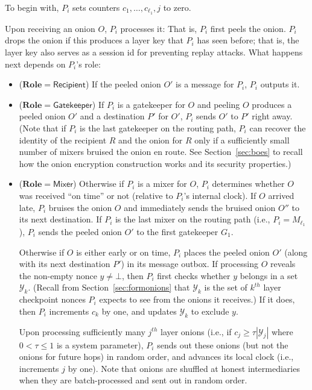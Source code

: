 \documentclass[runningheads,a4paper]{llncs}
\begin{document}
To begin with, $P_i$ sets counters $c_1, \dots, c_{\ell_1}, j$ to zero. 

Upon receiving an onion $O$, $P_i$ processes it: That is, $P_i$ first peels the onion. $P_i$ drops the onion if this produces a layer key that $P_i$ has seen before; that is, the layer key also serves as a session id for preventing replay attacks. 
What happens next depends on $P_i$'s role:
\begin{itemize}
\item ($\mathbf{Role} = \mathsf{Recipient}$) If the peeled onion $O'$ is a message for $P_i$, $P_i$ outputs it.  

\item ($\mathbf{Role} = \mathsf{Gatekeeper}$) If $P_i$ is a gatekeeper for $O$ and peeling $O$ produces a peeled onion $O'$ and a destination $P'$ for $O'$, $P_i$ sends $O'$ to $P'$ right away. (Note that if $P_i$ is the last gatekeeper on the routing path, $P_i$ can recover the identity of the recipient $R$ and the onion for $R$ only if a sufficiently small number of mixers bruised the onion en route. See Section~\ref{sec:boes} to recall how the onion encryption construction works and its security properties.)  

\item ($\mathbf{Role} = \mathsf{Mixer}$)  Otherwise if $P_i$ is a mixer for $O$, $P_i$ determines whether $O$ was received ``on time'' or not (relative to $P_i$'s internal clock). 
If $O$ arrived late, $P_i$ bruises the onion $O$ and immediately sends the bruised onion $O''$ to its next destination. If $P_i$ is the last mixer on the routing path (i.e., $P_i = M_{\ell_1}$), $P_i$ sends the peeled onion $O'$ to the first gatekeeper $G_1$. 

\hspace{4mm} Otherwise if $O$ is either early or on time, $P_i$ places the peeled onion $O'$  (along with its next destination $P'$) in its message outbox. 
If processing $O$ reveals the non-empty nonce $y \neq \bot$, then $P_{i}$ first checks whether $y$ belongs in a set $\mathcal{Y}_k$. (Recall from Section~\ref{sec:formonions} that $\mathcal{Y}_k$ is the set of $k^{th}$ layer checkpoint nonces $P_i$ expects to see from the onions it receives.) If it does, then $P_i$ increments $c_k$ by one, and %
updates $\mathcal{Y}_k$ to exclude $y$. 

\hspace{4mm} Upon processing sufficiently many $j^{th}$ layer onions (i.e., if $c_j \ge \tau|\mathcal{Y}_j|$ where $0 < \tau \le 1$ is a system parameter), $P_i$ %
sends out these onions (but not the onions for future hops) in random order, and advances its local clock (i.e., increments $j$ by one). %
Note that onions are shuffled at honest intermediaries when they are batch-processed and sent out in random order. 
\end{itemize} 
\end{document}
